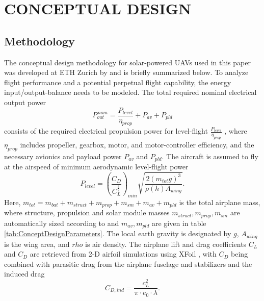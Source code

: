 \section{CONCEPTUAL DESIGN}
\subsection{Methodology} \label{sec:ConceptualDesignMethodology}
The conceptual design methodology for solar-powered UAVs used in this paper was developed at ETH Zurich by \cite{Noth_PhD,Leutenegger_JIRS} and is briefly summarized below. To analyze flight performance and a potential perpetual flight capability, the energy input/output-balance needs to be modeled. The total required nominal electrical output power
\begin{equation} \label{eqn:P_out}
P_{out}^{\,nom}=\frac{P_{level}}{\eta_{prop}}+P_{av}+P_{pld}
\end{equation}
consists of the required electrical propulsion power for level-flight $\frac{P_{level}}{\eta_{prop}}$ , where $\eta_{prop}$ includes propeller, gearbox, motor, and motor-controller efficiency, and the necessary avionics and payload power $P_{av}$ and $P_{pld}$. The aircraft is assumed to fly at the airspeed of minimum aerodynamic level-flight power
\begin{equation} \label{eqn:P_level}
P_{level}=\left(\frac{C_D}{C_L^\frac{3}{2}}\right)_{min}\sqrt{\frac{2(m_{tot}g)^3}{\rho(h)A_{wing}}} .
\end{equation}
Here, $m_{tot}=m_{bat}+m_{struct}+m_{prop}+m_{sm}+m_{av}+m_{pld}$ is the total airplane mass, where structure, propulsion and solar module masses $m_{struct},m_{prop},m_{sm}$ are automatically sized according to \cite{Noth_PhD,Leutenegger_JIRS} and $m_{av},m_{pld}$ are given in table \ref{tab:ConceptDesignParameters}. The local earth gravity is designated by $g$, $A_{wing}$ is the wing area, and $rho$ is air density. The airplane lift and drag coefficients $C_L$ and $C_D$ are retrieved from 2-D airfoil simulations using XFoil \cite{Drela_XFoil}, with $C_D$ being combined with parasitic drag from the airplane fuselage and stabilizers and the induced drag  
\begin{equation} \label{eqn:C_D}
C_{D,ind}=\frac{c_L^2}{\pi\cdot e_0\cdot\lambda} .
\end{equation}

